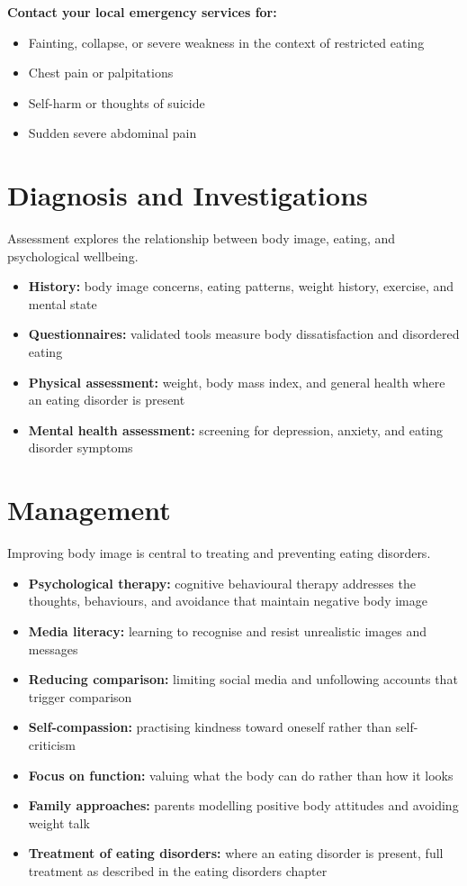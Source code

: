 \textbf{Contact your local emergency services for:}
\begin{itemize}
    \item Fainting, collapse, or severe weakness in the context of restricted eating
    \item Chest pain or palpitations
    \item Self-harm or thoughts of suicide
    \item Sudden severe abdominal pain
\end{itemize}

\section*{Diagnosis and Investigations}
Assessment explores the relationship between body image, eating, and psychological wellbeing.
\begin{itemize}
    \item \textbf{History:} body image concerns, eating patterns, weight history, exercise, and mental state
    \item \textbf{Questionnaires:} validated tools measure body dissatisfaction and disordered eating
    \item \textbf{Physical assessment:} weight, body mass index, and general health where an eating disorder is present
    \item \textbf{Mental health assessment:} screening for depression, anxiety, and eating disorder symptoms
\end{itemize}

\section*{Management}
Improving body image is central to treating and preventing eating disorders.
\begin{itemize}
    \item \textbf{Psychological therapy:} cognitive behavioural therapy addresses the thoughts, behaviours, and avoidance that maintain negative body image
    \item \textbf{Media literacy:} learning to recognise and resist unrealistic images and messages
    \item \textbf{Reducing comparison:} limiting social media and unfollowing accounts that trigger comparison
    \item \textbf{Self-compassion:} practising kindness toward oneself rather than self-criticism
    \item \textbf{Focus on function:} valuing what the body can do rather than how it looks
    \item \textbf{Family approaches:} parents modelling positive body attitudes and avoiding weight talk
    \item \textbf{Treatment of eating disorders:} where an eating disorder is present, full treatment as described in the eating disorders chapter
\end{itemize}

